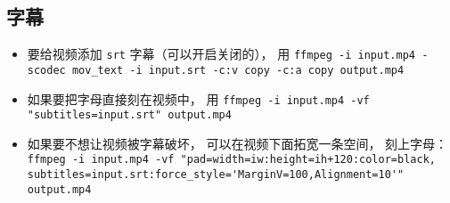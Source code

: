 \subsection{字幕}
\begin{itemize}
\item 要给视频添加 \verb`srt` 字幕（可以开启关闭的）， 用 \verb`ffmpeg -i input.mp4 -scodec mov_text -i input.srt -c:v copy -c:a copy output.mp4`
\item 如果要把字母直接刻在视频中， 用 \verb`ffmpeg -i input.mp4 -vf "subtitles=input.srt" output.mp4`
\item 如果要不想让视频被字幕破坏， 可以在视频下面拓宽一条空间， 刻上字母： \verb`ffmpeg -i input.mp4 -vf "pad=width=iw:height=ih+120:color=black, subtitles=input.srt:force_style='MarginV=100,Alignment=10'" output.mp4`
\end{itemize}
